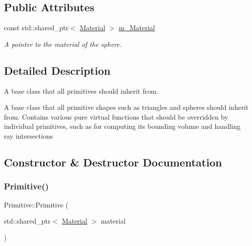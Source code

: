 \subsection*{Public Attributes}
\begin{DoxyCompactItemize}
\item 
\mbox{\label{class_primitive_ab9c59f10b927819e16fd11190f2875be}} 
const std\+::shared\+\_\+ptr$<$ \mbox{\hyperlink{class_material}{Material}} $>$ \mbox{\hyperlink{class_primitive_ab9c59f10b927819e16fd11190f2875be}{m\+\_\+\+Material}}
\begin{DoxyCompactList}\small\item\em A pointer to the material of the sphere. \end{DoxyCompactList}\end{DoxyCompactItemize}


\subsection{Detailed Description}
A base class that all primitives should inherit from. 

A base class that all primitive shapes such as triangles and spheres should inherit from. Contains various pure virtual functions that should be overridden by individual primitives, such as for computing its bounding volume and handling ray intersections 

\subsection{Constructor \& Destructor Documentation}
\mbox{\label{class_primitive_ad3472a19a06d276e0f0a52ba96b8928b}} 
\subsubsection{\texorpdfstring{Primitive()}{Primitive()}}
{\footnotesize\ttfamily Primitive\+::\+Primitive (\begin{DoxyParamCaption}\item[{std\+::shared\+\_\+ptr$<$ \mbox{\hyperlink{class_material}{Material}} $>$}]{material }\end{DoxyParamCaption})\hspace{0.3cm}{\ttfamily [inline]}}



